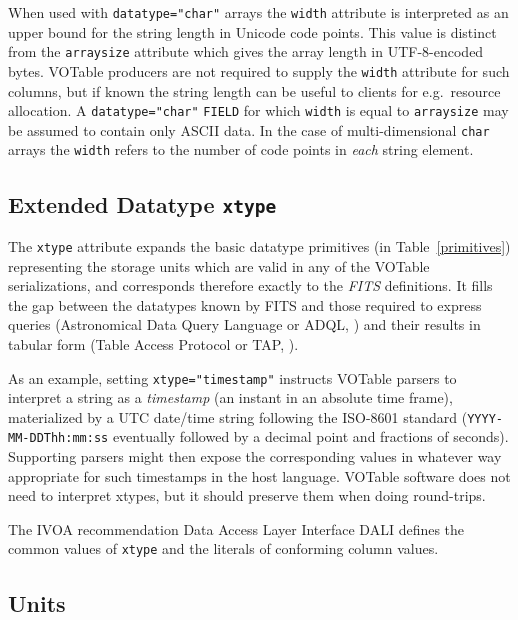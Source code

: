 \documentclass[11pt,a4paper]{ivoa}
\def\Tref#1{Table~\ref{#1}}
\let\fg=\color
\def\attr#1{{\tt{\fg{DarkRed}#1}}}
\def\elem#1{{\tt{\fg{DarkRed}#1}}}
\def\attrval#1#2{{\tt{\fg{DarkRed}#1}="{\fg{DarkPurple}#2}"}}
\begin{document}
When used with \attrval{datatype}{char} arrays the
\attr{width} attribute is interpreted as an upper bound for
the string length in Unicode code points.
This value is distinct from the \attr{arraysize} attribute
which gives the array length in UTF-8-encoded bytes.
VOTable producers are not required to supply the \attr{width} attribute
for such columns,
but if known the string length can be useful to clients
for e.g.\ resource allocation.
A \attrval{datatype}{char} \elem{FIELD}
for which \attr{width} is equal to \attr{arraysize}
may be assumed to contain only ASCII data.
In the case of multi-dimensional \texttt{char} arrays the \attr{width} refers
to the number of code points in \emph{each} string element.

\subsection{Extended Datatype \attr{xtype}}
\label{sec:xtype}

The \attr{xtype} attribute expands the basic
datatype primitives (in \Tref{primitives})
representing the storage units which are valid in any of the
VOTable serializations,
and corresponds therefore exactly to the {\em FITS} definitions.
It fills the gap between the datatypes
known by FITS and those required to express queries
(Astronomical Data Query Language or ADQL, \citet{2023ivoa.spec.1215M})
and their results in tabular form (Table Access Protocol or TAP,
\citet{2010ivoa.spec.0327D}).

As an example, setting \attrval{xtype}{timestamp} instructs VOTable
parsers to interpret a string as a {\em  timestamp}
(an instant in an absolute time frame), materialized by a
UTC date/time string following the ISO-8601 standard
({\tt YYYY-MM-DDThh:mm:ss} eventually followed by a decimal point
and fractions of seconds).  Supporting parsers might then expose the
corresponding values in whatever way appropriate for such timestamps in
the host language.  VOTable software does not need to interpret xtypes,
but it should preserve them when doing round-trips.

The IVOA recommendation Data Access Layer Interface DALI
\citep{2017ivoa.spec.0517D} defines the common values of \attr{xtype}
and the literals of conforming column values.

\subsection{Units}
\label{sec:unit}
\end{document}
